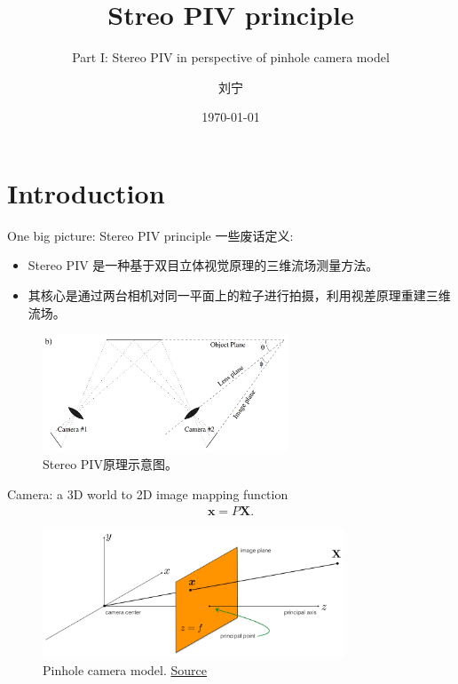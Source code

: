\documentclass[10pt,xcolor={table,dvipsnames},t]{beamer}
\title{Streo PIV principle}
\subtitle{Part I: Stereo PIV in perspective of pinhole camera model}
\author{刘宁}
\institute{浙江大学}
\date{\today}
\begin{document}
\begin{frame}
  \titlepage
\end{frame}

\section{Introduction}

\begin{frame}{One big picture: Stereo PIV principle}
  一些废话定义:
  \begin{itemize}
    \item Stereo PIV 是一种基于双目立体视觉原理的三维流场测量方法。
    \item 其核心是通过两台相机对同一平面上的粒子进行拍摄，利用视差原理重建三维流场。
  \end{itemize}
  
  \begin{figure}
    \centering
    \includegraphics[width=0.65\textwidth]{figures/spiv-big-picture.png}
    \caption{Stereo PIV原理示意图。}
  \end{figure}
\end{frame}

\begin{frame}{Camera: a 3D world to 2D image mapping function}
    \begin{align*}
      \mathbf{x} = P\mathbf{X}.
    \end{align*}

      \begin{figure}
        \centering
        \includegraphics[width=0.8\textwidth]{figures/pinhole-camera-model.png}
        \caption{Pinhole camera model. \href{https://www.cs.cmu.edu/~16385/s17/Slides/11.1\_Camera\_matrix.pdf}{Source}}
      \end{figure}
\end{frame}
\end{document}

